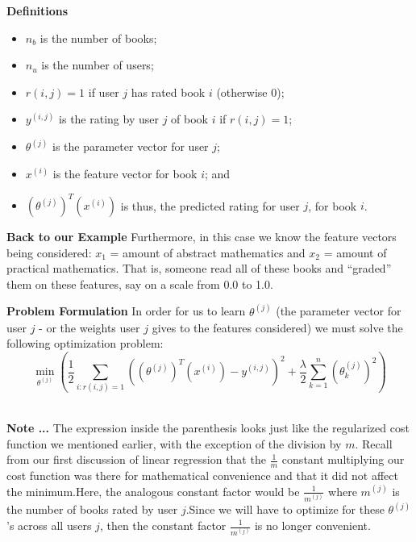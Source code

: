\documentclass[xcolor=dvipsnames]{beamer}
\begin{document}
\begin{frame}
{\bf Definitions}
\begin{itemize}
\item $n_b$ is the number of books; \pause
\item $n_u$ is the number of users;\pause
\item $r(i,j) = 1$ if user $j$ has rated book $i$ (otherwise 0);\pause
\item $y^{(i,j)}$ is the rating by user $j$ of book $i$ if $r(i,j) = 1$;\pause
\item $\theta^{(j)}$ is the parameter vector for user $j$;\pause
\item $x^{(i)}$ is the feature vector for book $i$; and \pause
\item $(\theta^{(j)})^T(x^{(i)})$ is thus, the predicted rating for user $j$, for book $i$.\\
\end{itemize}
\end{frame}

\begin{frame}
{\bf Back to our Example}
Furthermore, in this case we know the feature vectors being considered: $x_1$ = amount of abstract mathematics and $x_2$ = amount of practical mathematics. \vfill\pause That is, someone read all of these books and ``graded'' them on these features, say on a scale from 0.0 to 1.0. \\
\end{frame}

\begin{frame}
{\bf Problem Formulation}
In order for us to learn $\theta^{(j)}$ (the parameter vector for user $j$ - or the weights user $j$ gives to the features considered) we must solve the following optimization problem:
\vfill\pause
\[
\boxed{\min_{\theta^{(j)}} \left(\frac{1}{2} \sum_{i:r(i,j)=1}((\theta^{(j)})^T(x^{(i)}) - y^{(i,j)})^2 + \frac{\lambda}{2}\sum_{k=1}^n(\theta^{(j)}_k)^2\right)}
\]\\
\end{frame}


\begin{frame}
{\bf Note ...}
The expression inside the parenthesis looks just like the regularized cost function we mentioned earlier, with the exception of the division by $m$. \vfill\pause Recall from our first discussion of linear regression that the $\frac{1}{m}$ constant multiplying our cost function was there for mathematical convenience and that it did not affect the minimum.\vfill\pause Here, the analogous constant factor would be $\frac{1}{m^{(j)}}$ where $m^{(j)}$ is the number of books rated by user $j$.\vfill\pause Since we will have to optimize for these $\theta^{(j)}$'s across all users $j$, then the constant factor $\frac{1}{m^{(j)}}$ is no longer convenient.\\
\end{frame}
\end{document}
